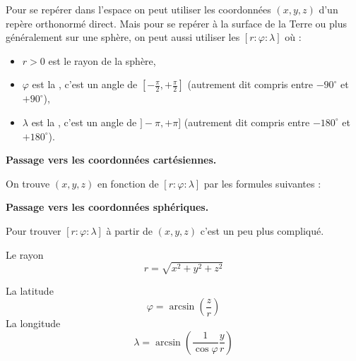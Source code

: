 \documentclass[11pt,class=report,crop=false]{standalone}
\begin{document}
\begin{cours}

Pour se repérer dans l'espace on peut utiliser les coordonnées $(x,y,z)$ d'un repère orthonormé direct. Mais pour se repérer à la surface de la Terre ou plus généralement sur une sphère, on peut aussi utiliser les  $[r :\varphi :\lambda]$ où :
\begin{itemize}
	\item $r>0$ est le rayon de la sphère,
	\item $\varphi$ est la , c'est un angle de $[-\frac\pi2,+\frac\pi2]$ (autrement dit compris entre $-90^\circ$ et $+90^\circ$),
	\item $\lambda$ est la , c'est un angle de $]-\pi,+\pi]$ (autrement dit compris entre $-180^\circ$ et $+180^\circ$).
\end{itemize}



\bigskip

\textbf{Passage vers les coordonnées cartésiennes.}

On trouve $(x,y,z)$ en fonction de $[r :\varphi :\lambda]$ par les formules suivantes :
	


\bigskip

\textbf{Passage vers les coordonnées sphériques.}

Pour trouver  $[r :\varphi :\lambda]$ à partir de $(x,y,z)$ c'est un peu plus compliqué.

Le rayon 
$$r = \sqrt{x^ 2+y^ 2+z^2}$$

La latitude
$$\varphi = \arcsin \left( \frac{z}{r}\right)$$
La longitude
$$\lambda = \arcsin\left( \frac{1}{\cos\varphi}\frac{y}{r}\right)$$

\end{cours}


\end{document}
